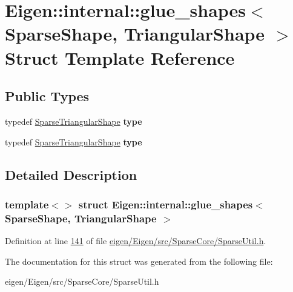\hypertarget{struct_eigen_1_1internal_1_1glue__shapes_3_01_sparse_shape_00_01_triangular_shape_01_4}{}\section{Eigen\+:\+:internal\+:\+:glue\+\_\+shapes$<$ Sparse\+Shape, Triangular\+Shape $>$ Struct Template Reference}
\label{struct_eigen_1_1internal_1_1glue__shapes_3_01_sparse_shape_00_01_triangular_shape_01_4}
\subsection*{Public Types}
\begin{DoxyCompactItemize}
\item 
\mbox{\label{struct_eigen_1_1internal_1_1glue__shapes_3_01_sparse_shape_00_01_triangular_shape_01_4_a0d53b8f571c176e561262c760085af26}} 
typedef \hyperlink{struct_eigen_1_1internal_1_1_sparse_triangular_shape}{Sparse\+Triangular\+Shape} {\bfseries type}
\item 
\mbox{\label{struct_eigen_1_1internal_1_1glue__shapes_3_01_sparse_shape_00_01_triangular_shape_01_4_a0d53b8f571c176e561262c760085af26}} 
typedef \hyperlink{struct_eigen_1_1internal_1_1_sparse_triangular_shape}{Sparse\+Triangular\+Shape} {\bfseries type}
\end{DoxyCompactItemize}


\subsection{Detailed Description}
\subsubsection*{template$<$$>$\newline
struct Eigen\+::internal\+::glue\+\_\+shapes$<$ Sparse\+Shape, Triangular\+Shape $>$}



Definition at line \hyperlink{eigen_2_eigen_2src_2_sparse_core_2_sparse_util_8h_source_l00141}{141} of file \hyperlink{eigen_2_eigen_2src_2_sparse_core_2_sparse_util_8h_source}{eigen/\+Eigen/src/\+Sparse\+Core/\+Sparse\+Util.\+h}.



The documentation for this struct was generated from the following file\+:\begin{DoxyCompactItemize}
\item 
eigen/\+Eigen/src/\+Sparse\+Core/\+Sparse\+Util.\+h\end{DoxyCompactItemize}
